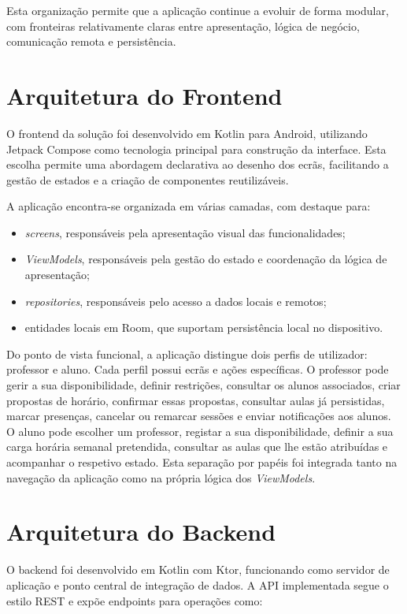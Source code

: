 Esta organização permite que a aplicação continue a evoluir de forma modular, com fronteiras relativamente claras entre
apresentação, lógica de negócio, comunicação remota e persistência.

\section{Arquitetura do Frontend}

O frontend da solução foi desenvolvido em Kotlin para Android, utilizando Jetpack Compose como tecnologia principal para
construção da interface. Esta escolha permite uma abordagem declarativa ao desenho dos ecrãs, facilitando a gestão de
estados e a criação de componentes reutilizáveis.

A aplicação encontra-se organizada em várias camadas, com destaque para:

\begin{itemize}
    \item \textit{screens}, responsáveis pela apresentação visual das funcionalidades;
    \item \textit{ViewModels}, responsáveis pela gestão do estado e coordenação da lógica de apresentação;
    \item \textit{repositories}, responsáveis pelo acesso a dados locais e remotos;
    \item entidades locais em Room, que suportam persistência local no dispositivo.
\end{itemize}

Do ponto de vista funcional, a aplicação distingue dois perfis de utilizador: professor e aluno.
Cada perfil possui ecrãs e ações específicas.
O professor pode gerir a sua disponibilidade, definir restrições, consultar os alunos associados, criar propostas de horário, confirmar essas propostas, consultar aulas já persistidas, marcar presenças, cancelar ou remarcar sessões e enviar notificações aos alunos. O aluno pode escolher um professor, registar a sua disponibilidade, definir a sua carga horária semanal pretendida, consultar as aulas que lhe estão atribuídas e acompanhar o respetivo estado.
Esta separação por papéis foi integrada tanto na navegação da aplicação como na própria lógica dos \textit{ViewModels}.

\section{Arquitetura do Backend}

O backend foi desenvolvido em Kotlin com Ktor, funcionando como servidor de aplicação e ponto central de integração de dados.
A API implementada segue o estilo REST e expõe endpoints para operações como:

